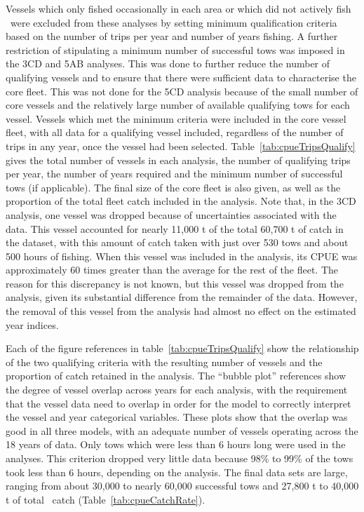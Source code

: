 Vessels which only fished occasionally in each area or which did not actively fish \fishname\ were excluded from these analyses by setting minimum qualification criteria based on the number of trips per year and number of years fishing. A further restriction of stipulating a minimum number of successful tows was imposed in the 3CD and 5AB analyses. This was done to further reduce the number of qualifying vessels and to ensure that there were sufficient data to characterise the core fleet. This was not done for the 5CD analysis because of the small number of core vessels and the relatively large number of available qualifying tows for each vessel. Vessels which met the minimum criteria were included in the core vessel fleet, with all data for a qualifying vessel included, regardless of the number of trips in any year, once the vessel had been selected. Table~\ref{tab:cpueTripsQualify} gives the total number of vessels in each analysis, the number of qualifying trips per year, the number of years required and the minimum number of successful tows (if applicable). The final size of the core fleet is also given, as well as the proportion of the total fleet catch included in the analysis. Note that, in the 3CD analysis, one vessel was dropped because of uncertainties associated with the data. This vessel accounted for nearly 11,000 t of the total 60,700 t of catch in the dataset, with this amount of catch taken with just over 530 tows and about 500 hours of fishing. When this vessel was included in the analysis, its CPUE was approximately 60 times greater than the average for the rest of the fleet. The reason for this discrepancy is not known, but this vessel was dropped from the analysis, given its substantial difference from the remainder of the data. However, the removal of this vessel from the analysis had almost no effect on the estimated year indices.

Each of the figure references in table~\ref{tab:cpueTripsQualify} show the relationship of the two qualifying criteria with the resulting number of vessels and the proportion of catch retained in the analysis. The “bubble plot” references show the degree of vessel overlap across years for each analysis, with the requirement that the vessel data need to overlap in order for the model to correctly interpret the vessel and year categorical variables. These plots show that the overlap was good in all three models, with an adequate number of vessels operating across the 18 years of data. Only tows which were less than 6 hours long were used in the analyses. This criterion dropped very little data because 98\% to 99\% of the tows took less than 6 hours, depending on the analysis. The final data sets are large, ranging from about 30,000 to nearly 60,000 successful tows and 27,800 t to 40,000 t of total \fishname\ catch (Table~\ref{tab:cpueCatchRate}).

